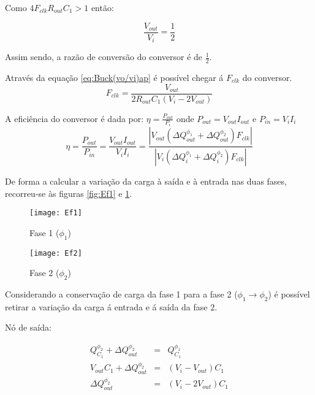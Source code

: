 \documentclass[12pt]{article}
\begin{document}
Como $4F_{clk}R_{out}C_1 > 1$ então: 

{\footnotesize\begin{equation}
\label{eq:Buck(vo/vi)f}
\frac{V_{out}}{V_i} = \frac{1}{2}
\end{equation}}
\vspace{5mm}
  
Assim sendo, a razão de conversão do conversor é de $\frac{1}{2}$.

Através da equação \ref{eq:Buck(vo/vi)ap} é possível chegar á $F_{clk}$ do conversor.
{\footnotesize\begin{equation}
\label{eq:FBuck(vo/vi)}
F_{clk}=\frac{V_{out}}{2R_{out}C_{1}(V_i-2V_{out})}
\end{equation}}
\vspace{5mm}

A eficiência do conversor é dada por: $\eta = \frac{P_{out}}{P_{i}}$ onde $P_{out} = V_{out}I_{out}$ e $P_{in} = V_{i}I_{i}$
{\footnotesize\begin{equation}
\label{eq:EfBuck(vo/vi)}
\eta = \frac{P_{out}}{P_{in}} = \frac{ V_{out}I_{out}}{ V_iI_i} = \frac{|V_{out}(\Delta Q^{\phi_1}_{out} + \Delta Q^{\phi_2}_{out})F_{clk}|}{{|V_i(\Delta Q^{\phi_1}_{i} + \Delta Q^{\phi_2}_{i})F_{clk}|}}
\end{equation}}

De forma a calcular a variação da carga à saída e à entrada nas duas fases, recorreu-se às figuras \ref{fig:Ef1} e \ref{fig:Ef2}. 

\begin{figure}[htbp]
\centering
\begin{minipage}{.5\textwidth}
	\centering
	\texttt{[image: Ef1]}
	\caption{Fase 1 ($\phi_1$)}
	\label{fig:Ef1}
\end{minipage}%
\begin{minipage}{.5\textwidth}
	\centering
	\texttt{[image: Ef2]}
	\caption{Fase 2 ($\phi_2$)}
	\label{fig:Ef2}
\end{minipage}
\end{figure}

Considerando a conservação de carga da fase 1 para a fase 2 ($\phi_1 \rightarrow \phi_2$) é possível retirar a variação da carga á entrada e á saída da fase 2.
\vspace{5mm}

Nó de saída:

{\footnotesize \begin{equation}  
\label{eq:Variao2}
\begin{array}{ccc}
    Q^{\phi_2}_{C_1} + \Delta Q^{\phi_2}_{out} &=& Q^{\phi_1}_{C_1}\\  [1em]        
    V_{out}C_1+\Delta Q^{\phi_2}_{out} &=& (V_i-V_{out})C_1 \\[1em]
    \Delta Q^{\phi_2}_{out} &=& (V_i - 2V_{out})C_1  
  \end{array}
  \end{equation}}
  \vspace{5mm}
  
\end{document}
